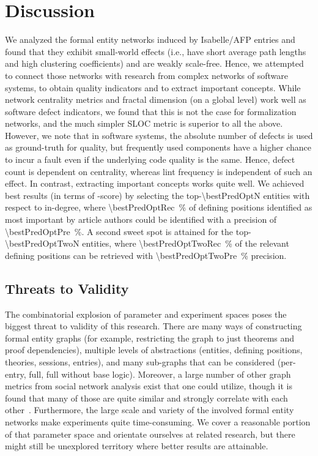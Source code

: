 \section{Discussion}\label{sec:conclusion}
We analyzed the formal entity networks induced by Isabelle/AFP entries
and found that they exhibit small-world effects (i.e., have short average path lengths and high clustering coefficients)
and are weakly scale-free.
Hence, we attempted to connect those networks with research from complex networks of software systems,
to obtain quality indicators and to extract important concepts.
While network centrality metrics and fractal dimension (on a global level) work well as software defect indicators,
we found that this is not the case for formalization networks,
and the much simpler SLOC metric is superior to all the above.
However, we note that in software systems, the absolute number of defects is used as ground-truth for quality,
but frequently used components have a higher chance to incur a fault even if the underlying code quality is the same.
Hence, defect count is dependent on centrality, whereas lint frequency is independent of such an effect.
In contrast, extracting important concepts works quite well.
We achieved best results (in terms of \fOne-score) by selecting the top-\num{\bestPredOptN} entities with respect to in-degree,
where \SI[round-mode=places,round-precision=1]{\bestPredOptRec}{\percent} of defining positions
identified as most important by article authors could be identified with a precision of \SI[round-mode=places,round-precision=1]{\bestPredOptPre}{\percent}.
A second sweet spot is attained for the top-\num{\bestPredOptTwoN} entities, where \SI[round-mode=places,round-precision=1]{\bestPredOptTwoRec}{\percent} of the relevant defining positions can be retrieved
with \SI[round-mode=places,round-precision=1]{\bestPredOptTwoPre}{\percent} precision.

\subsection{Threats to Validity}
The combinatorial explosion of parameter and experiment spaces poses the biggest threat to validity of this research.
There are many ways of constructing formal entity graphs
(for example, restricting the graph to just theorems and proof dependencies),
multiple levels of abstractions (entities, defining positions, theories, sessions, entries),
and many sub-graphs that can be considered (per-entry, full, full without base logic).
Moreover, a large number of other graph metrics from social network analysis exist that one could utilize,
though it is found that many of those are quite similar and strongly correlate with each other~\cite{MetricsOO2010Concas}.
Furthermore, the large scale and variety of the involved formal entity networks make experiments quite time-consuming.
We cover a reasonable portion of that parameter space and orientate ourselves at related research,
but there might still be unexplored territory where better results are attainable.


